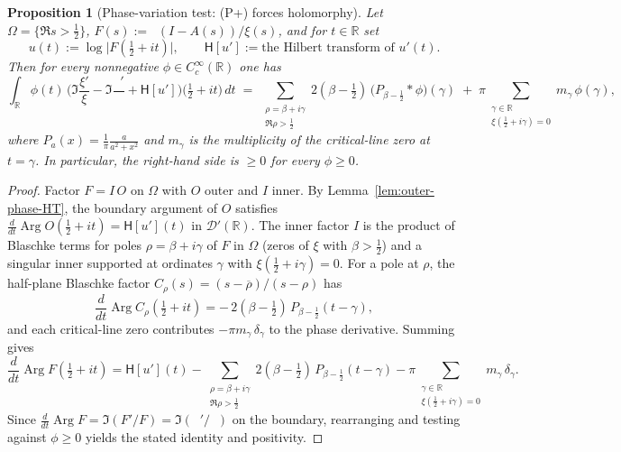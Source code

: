 \documentclass[11pt]{article}
\newtheorem{proposition}[theorem]{Proposition}
\theoremstyle{definition}
\theoremstyle{remark}
\newcommand{\R}{\mathbb{R}}
\DeclareMathOperator{\dettwo}{det_2}
\DeclareMathOperator{\Arg}{Arg}
\begin{document}
\begin{proposition}[Phase-variation test: (P+) forces holomorphy]\label{prop:Pplus-holomorphy}
Let \(\Omega=\{\Re s>\tfrac12\}\), \(F(s):=\dettwo(I-A(s))/\xi(s)\), and for \(t\in\R\) set
\[
 u(t):=\log\big|F(\tfrac12+it)\big|,\qquad
 \mathsf H[u']:=\text{the Hilbert transform of }u'(t).
\]
Then for every nonnegative \(\phi\in C_c^\infty(\R)\) one has
\[
\int_{\R}\!\phi(t)\,\Big(\Im\frac{\xi'}{\xi}-\Im\frac{\dettwo'}{\dettwo}+\mathsf H[u']\Big)\!\Big(\tfrac12+it\Big)\,dt
\;=\;\sum_{\substack{\rho=\beta+i\gamma\\ \Re\rho>\tfrac12}}\! 2(\beta-\tfrac12)\,\big(P_{\beta-\tfrac12}\!\ast\phi\big)(\gamma)
\; +\; \pi\!\!\sum_{\substack{\gamma\in\R\\ \xi(\tfrac12+i\gamma)=0}}\! m_\gamma\,\phi(\gamma),
\]
where \(P_a(x)=\frac{1}{\pi}\frac{a}{a^2+x^2}\) and \(m_\gamma\) is the multiplicity of the critical-line zero at \(t=\gamma\). In particular, the right-hand side is \(\ge 0\) for every \(\phi\ge 0\).
\end{proposition}
\begin{proof}
Factor \(F=I\,O\) on \(\Omega\) with \(O\) outer and \(I\) inner. By Lemma~\ref{lem:outer-phase-HT}, the boundary argument of \(O\) satisfies \(\frac{d}{dt}\Arg O(\tfrac12+it)=\mathsf H[u'](t)\) in \(\mathcal D'(\R)\). The inner factor \(I\) is the product of Blaschke terms for poles \(\rho=\beta+i\gamma\) of \(F\) in \(\Omega\) (zeros of \(\xi\) with \(\beta>\tfrac12\)) and a singular inner supported at ordinates \(\gamma\) with \(\xi(\tfrac12+i\gamma)=0\). For a pole at \(\rho\), the half-plane Blaschke factor \(C_\rho(s)=(s-\overline\rho)/(s-\rho)\) has
\[
\frac{d}{dt}\Arg C_\rho(\tfrac12+it)=-\,2(\beta-\tfrac12)\,P_{\beta-\tfrac12}(t-\gamma),
\]
and each critical-line zero contributes \(-\pi m_\gamma\,\delta_\gamma\) to the phase derivative. Summing gives
\[
\frac{d}{dt}\Arg F(\tfrac12+it)=\mathsf H[u'](t)
-\sum_{\substack{\rho=\beta+i\gamma\\ \Re\rho>\tfrac12}}\! 2(\beta-\tfrac12)\,P_{\beta-\tfrac12}(t-\gamma)
-\pi\!\!\sum_{\substack{\gamma\in\R\\ \xi(\tfrac12+i\gamma)=0}}\! m_\gamma\,\delta_\gamma.
\]
Since \(\frac{d}{dt}\Arg F=\Im(F'/F)=\Im(\dettwo'/\dettwo)\) on the boundary, rearranging and testing against \(\phi\ge 0\) yields the stated identity and positivity.
\end{proof}
\end{document}
